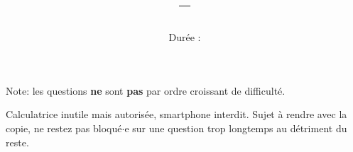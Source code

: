 \documentclass[a4paper,12pt]{scrartcl}
\date{}
\title{\typedevoir{} -- \classe{}\writecorrword{}}
\author{Durée : \duree{}}
\begin{document}
\maketitle 

Note: les questions \textbf{ne} sont \textbf{pas} par ordre croissant de difficulté. 

Calculatrice inutile mais autorisée, smartphone interdit. Sujet à rendre avec la copie, ne restez pas bloqué$\cdot$e sur une question trop longtemps au détriment du reste.










\end{document}
